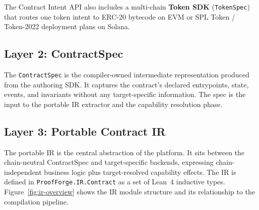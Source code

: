 \documentclass[sigconf]{acmart}
\begin{document}
The Contract Intent API also includes a multi-chain \textbf{Token SDK}
(\texttt{TokenSpec}) that routes one token intent to ERC-20 bytecode on EVM or SPL
Token / Token-2022 deployment plans on Solana.

\subsection{Layer 2: ContractSpec}

The \texttt{ContractSpec} is the compiler-owned intermediate representation produced from the
authoring SDK. It captures the contract's declared entrypoints, state, events, and invariants
without any target-specific information. The spec is the input to the portable IR extractor and
the capability resolution phase.

\subsection{Layer 3: Portable Contract IR}
\label{sec:ir}

The portable IR is the central abstraction of the platform. It sits between the chain-neutral
ContractSpec and target-specific backends, expressing chain-independent business logic plus
target-resolved capability effects. The IR is defined in \texttt{ProofForge.IR.Contract} as a
set of Lean~4 inductive types. Figure~\ref{fig:ir-overview} shows the IR module structure and
its relationship to the compilation pipeline.
\end{document}
